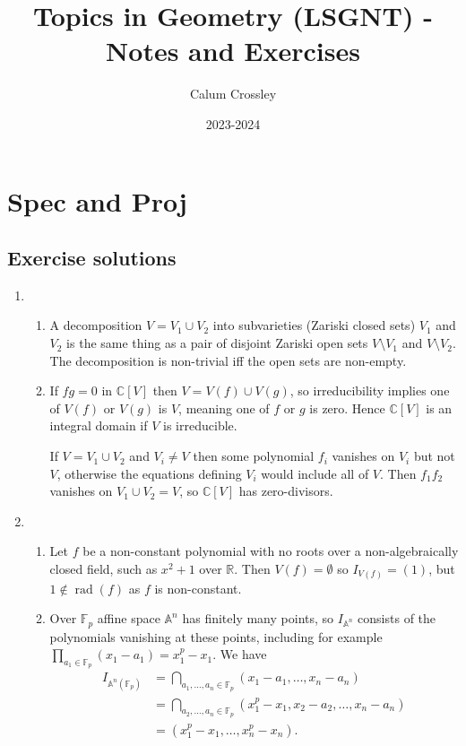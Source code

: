 \documentclass[a4paper]{article}
\title{Topics in Geometry (LSGNT) - Notes and Exercises}
\author{Calum Crossley}
\date{2023-2024}
\theoremstyle{definition}
\theoremstyle{remark}
\DeclareMathOperator{\rad}{rad}
\newcommand{\F}{\mathbb{F}}
\newcommand{\A}{\mathbb{A}}
\newcommand{\R}{\mathbb{R}}
\newcommand{\C}{\mathbb{C}}
\begin{document}
\maketitle

\section{Spec and Proj}

\subsection*{Exercise solutions}

\begin{enumerate}

\item
\begin{enumerate}[label=(\alph*)]

\item 
A decomposition $V=V_1\cup V_2$ into subvarieties (Zariski
closed sets) $V_1$ and $V_2$ is the same thing as a pair of
disjoint Zariski open sets $V\setminus V_1$ and
$V\setminus V_2$. The decomposition is non-trivial iff the open
sets are non-empty.

\item
If $fg=0$ in $\C[V]$ then $V=V(f)\cup V(g)$, so irreducibility
implies one of $V(f)$ or $V(g)$ is $V$, meaning one of $f$ or
$g$ is zero. Hence $\C[V]$ is an integral domain if $V$ is
irreducible.

If $V=V_1\cup V_2$ and $V_i\ne V$ then some polynomial
$f_i$ vanishes on $V_i$ but not $V$, otherwise the equations
defining $V_i$ would include all of $V$. Then $f_1f_2$ vanishes
on $V_1\cup V_2=V$, so $\C[V]$ has zero-divisors.

\end{enumerate}

\item
\begin{enumerate}[label=(\alph*)]

\item 
Let $f$ be a non-constant polynomial with no roots over a non-algebraically
closed field, such as $x^2+1$ over $\R$. Then $V(f)=\emptyset$ so
$I_{V(f)}=(1)$, but $1\notin\rad(f)$ as $f$ is non-constant.

\item
Over $\F_p$ affine space $\A^n$ has finitely many points, so $I_{\A^n}$ consists
of the polynomials vanishing at these points, including for example
$\prod_{a_1\in\F_p}(x_1-a_1)=x_1^p-x_1$. We have
\begin{align*}
    I_{\A^n(\F_p)}
        &= \bigcap_{a_1,\ldots,a_n\in\F_p}(x_1-a_1,\ldots,x_n-a_n) \\
        &= \bigcap_{a_2,\ldots,a_n\in\F_p}(x_1^p-x_1,x_2-a_2,\ldots,x_n-a_n) \\
        &= (x_1^p-x_1,\ldots,x_n^p-x_n).
\end{align*}


\end{enumerate}
\end{enumerate}
\end{document}

